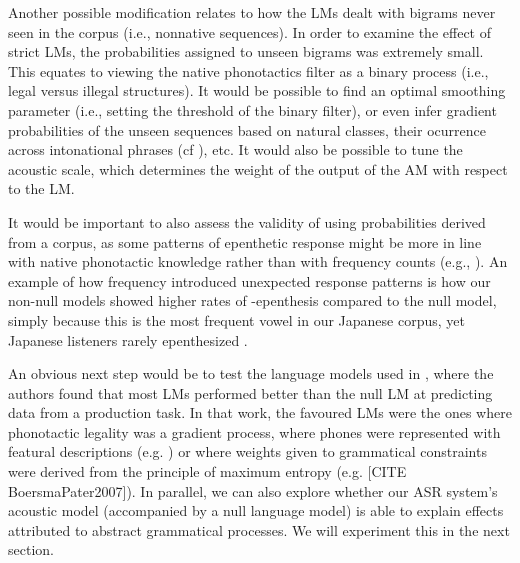 {Another possible modification relates to how the LMs dealt with bigrams never seen in the corpus (i.e., nonnative sequences). In order to examine the effect of strict LMs, the probabilities assigned to unseen bigrams was extremely small. This equates to viewing the native phonotactics filter as a binary process (i.e., legal versus illegal structures). It would be possible to find an optimal smoothing parameter (i.e., setting the threshold of the binary filter), or even infer gradient probabilities of the unseen sequences based on natural classes, their ocurrence across intonational phrases (cf \cite{durvasula2016}), etc. It would also be possible to tune the acoustic scale, which determines the weight of the output of the AM with respect to the LM.

It would be important to also assess the validity of using probabilities derived from a corpus, as some patterns of epenthetic response might be more in line with native phonotactic knowledge rather than with frequency counts (e.g., \cite{kabak2007}). An example of how frequency introduced unexpected response patterns is how our non-null models showed higher rates of -epenthesis compared to the null model, simply because this is the most frequent vowel in our Japanese corpus, yet Japanese listeners rarely epenthesized \textipa{[a]}.  

An obvious next step would be to test the language models used in \cite{wilson2013}, where the authors found that most LMs performed better than the null LM at predicting data from a production task. In that work, the favoured LMs were the ones where phonotactic legality was a gradient process, where phones were represented with featural descriptions (e.g. {\color{red}\cite{albright2009}}) or where weights given to grammatical constraints were derived from the principle of maximum entropy (e.g. {\color{red}[CITE BoersmaPater2007]}\cite{hayes2008}). In parallel, we can also explore whether our ASR system's acoustic model (accompanied by a null language model) is able to explain effects attributed to abstract grammatical processes. We will experiment this in the next section. 


}
